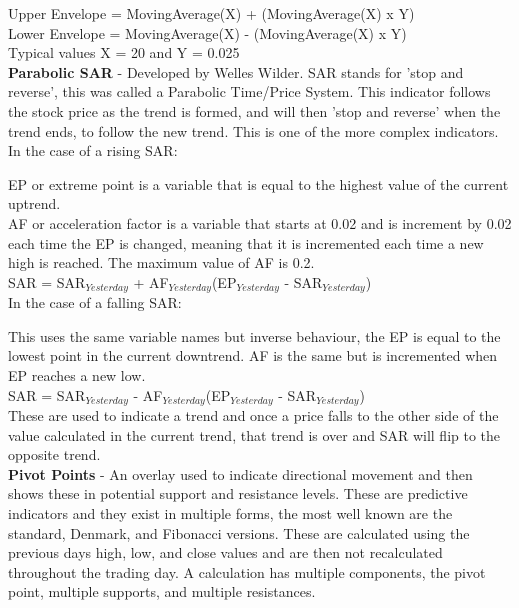 \documentclass[12pt,a4paper]{article}
\begin{document}
Upper Envelope = MovingAverage(X) + (MovingAverage(X) x Y)\\
Lower Envelope = MovingAverage(X) - (MovingAverage(X) x Y)\\
Typical values X = 20 and Y = 0.025\\

\iffalse
[]
\fi

\textbf{Parabolic SAR} - Developed by Welles Wilder. SAR stands for 'stop and reverse', this was called a Parabolic Time/Price System. This indicator follows the stock price as the trend is formed, and will then 'stop and reverse' when the trend ends, to follow the new trend. This is one of the more complex indicators.\\

In the case of a rising SAR:

EP or extreme point is a variable that is equal to the highest value of the current uptrend.\\
AF or acceleration factor is a variable that starts at 0.02 and is increment by 0.02 each time the EP is changed, meaning that it is incremented each time a new high is reached. The maximum value of AF is 0.2. \\

SAR = SAR$_{Yesterday}$ + AF$_{Yesterday}$(EP$_{Yesterday}$ - SAR$_{Yesterday}$) \\

In the case of a falling SAR:

This uses the same variable names but inverse behaviour, the EP is equal to the lowest point in the current downtrend. AF is the same but is incremented when EP reaches a new low. \\

SAR = SAR$_{Yesterday}$ - AF$_{Yesterday}$(EP$_{Yesterday}$ - SAR$_{Yesterday}$) \\

These are used to indicate a trend and once a price falls to the other side of the value calculated in the current trend, that trend is over and SAR will flip to the opposite trend. \\

\iffalse
[]
\fi

\textbf{Pivot Points} - An overlay used to indicate directional movement and then shows these in potential support and resistance levels. These are predictive indicators and they exist in multiple forms, the most well known are the standard, Denmark, and Fibonacci versions. These are calculated using the previous days high, low, and close values and are then not recalculated throughout the trading day. A calculation has multiple components, the pivot point, multiple supports, and multiple resistances.\\
\end{document}
